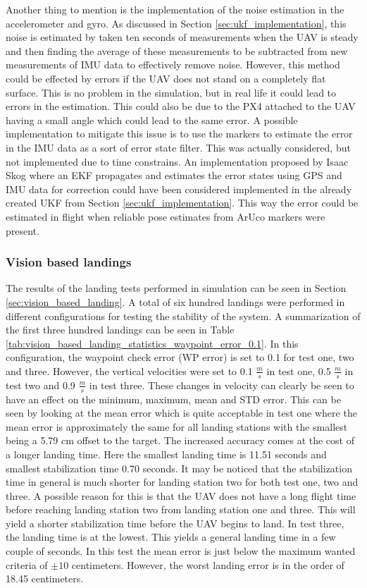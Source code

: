 \documentclass[../Head/report.tex]{subfiles}
\begin{document}
Another thing to mention is the implementation of the noise estimation in the accelerometer and gyro. As discussed in Section \ref{sec:ukf_implementation}, this noise is estimated by taken ten seconds of measurements when the UAV is steady and then finding the average of these measurements to be subtracted from new measurements of IMU data to effectively remove noise. However, this method could be effected by errors if the UAV does not stand on a completely flat surface. This is no problem in the simulation, but in real life it could lead to errors in the estimation. This could also be due to the PX4 attached to the UAV having a small angle which could lead to the same error. A possible implementation to mitigate this issue is to use the markers to estimate the error in the IMU data as a sort of error state filter. This was actually considered, but not implemented due to time constrains. An implementation proposed by Isaac Skog \cite{GNSSaidedINS} where an EKF propagates and estimates the error states using GPS and IMU data for correction could have been considered implemented in the already created UKF from Section \ref{sec:ukf_implementation}. This way the error could be estimated in flight when reliable pose estimates from ArUco markers were present.    

\subsubsection*{Vision based landings}
The results of the landing tests performed in simulation can be seen in Section \ref{sec:vision_based_landing}. A total of six hundred landings were performed in different configurations for testing the stability of the system. A summarization of the first three hundred landings can be seen in Table \ref{tab:vision_based_landing_statistics_waypoint_error_0.1}. In this configuration, the waypoint check error (WP error) is set to 0.1 for test one, two and three. However, the vertical velocities were set to 0.1 $\frac{m}{s}$ in test one, 0.5 $\frac{m}{s}$ in test two and 0.9 $\frac{m}{s}$ in test three. These changes in velocity can clearly be seen to have an effect on the minimum, maximum, mean and STD error. This can be seen by looking at the mean error which is quite acceptable in test one where the mean error is approximately the same for all landing stations with the smallest being a 5.79 cm offset to the target. The increased accuracy comes at the cost of a longer landing time. Here the smallest landing time is 11.51 seconds and smallest stabilization time 0.70 seconds. It may be noticed that the stabilization time in general is much shorter for landing station two for both test one, two and three. A possible reason for this is that the UAV does not have a long flight time before reaching landing station two from landing station one and three. This will yield a shorter stabilization time before the UAV begins to land. In test three, the landing time is at the lowest. This yields a general landing time in a few couple of seconds. In this test the mean error is just below the maximum wanted criteria of $\pm 10$ centimeters. However, the worst landing error is in the order of 18.45 centimeters. 
\end{document}
